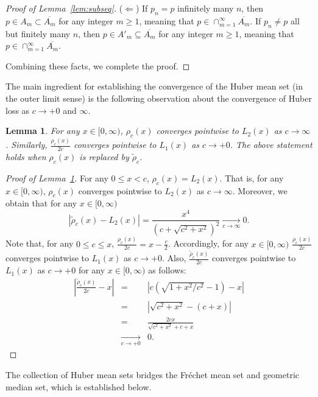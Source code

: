 \documentclass[preprint]{imsart}
\theoremstyle{plain}
\newtheorem{lemma}{Lemma}
\theoremstyle{remark}
\begin{document}
\begin{appendix}
\begin{proof}[Proof of Lemma~\ref{lem:subseq}]
($\Leftarrow$) If $p_{n}=p$ infinitely many $n$, then $p \in A_{m} \subset \overline{A_{m}}$ for any integer $m \ge 1$, meaning that $p \in \cap_{m=1}^{\infty} \overline{A_{m}}$. If $p_{n} \neq p$ all but finitely many $n$, then $p \in A'_{m} \subseteq \overline{A_{m}}$ for any integer $m\ge 1$, meaning that $p \in \cap_{m=1}^{\infty} \overline{A_{m}}$. 



Combining these facts, we complete the proof.    
\end{proof}


The main ingredient for establishing the convergence of the Huber mean set (in the outer limit sense) is the following observation about the convergence of Huber loss as $c \rightarrow +0$ and $\infty$.
\begin{lemma}\label{lem:unif:conv}
For any $x \in [0, \infty)$, $\rho_{c}(x)$ converges pointwise to $L_{2}(x)$ as $c \rightarrow \infty$. Similarly, $\frac{\rho_{c}(x)}{2c}$ converges pointwise to $L_{1}(x)$ as $c \rightarrow +0$. The above statement holds when $\rho_{c}(x)$ is replaced by $\tilde{\rho}_{c}$.
\end{lemma}

\begin{proof}[Proof of Lemma~\ref{lem:unif:conv}]
For any $0 \le x < c$, $\rho_{c}(x) = L_{2}(x)$. That is, for any $x \in [0, \infty)$, $\rho_{c}(x)$ converges pointwise to $L_{2}(x)$ as $c \rightarrow \infty$. Moreover, we obtain that for any $x \in [0, \infty)$ 
\[
|\tilde{\rho}_{c}(x) - L_{2}(x)| = \frac{x^4}{(c+\sqrt{c^2+x^2})^2} \underset{c \rightarrow \infty}{\rightarrow} 0.
\]
Note that, for any $0 \le c \le x$,  $\frac{\rho_{c}(x)}{2c}=x - \frac{c}{2}$. Accordingly, for any $x \in [0, \infty)$ $\frac{\rho_{c}(x)}{2c}$ converges pointwise to $L_{1}(x)$ as $c\rightarrow +0$. Also, $\frac{\tilde{\rho}_{c}(x)}{2c}$ converges pointwise to $L_{1}(x)$ as $c\rightarrow +0$ for any $x \in [0, \infty)$ as follows:
\begin{eqnarray*}
|\frac{\tilde{\rho}_{c}(x)}{2c} - x| &=& |c(\sqrt{1+x^2/c^2} - 1) - x| \\
&=& |\sqrt{c^2 + x^2} - (c + x)|  \\
&=& \frac{2cx}{\sqrt{c^2+x^2}+c+x} \\
&\underset{c \rightarrow +0}{\rightarrow}& 0.
\end{eqnarray*}
\end{proof}

The collection of Huber mean sets bridges the Fr\'{e}chet mean set and geometric median set, which is established below. 


\end{appendix}
\end{document}
